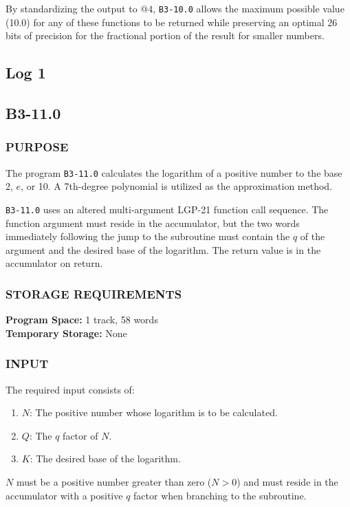 \documentclass{article}
\begin{document}
By standardizing the output to $@4$, \texttt{B3-10.0} allows the maximum possible value (10.0) for any of these functions to be returned while preserving an optimal 26 bits of precision for the fractional portion of the result for smaller numbers.

\newpage
\subsection{Log 1}
\label{sec:logarithm_function}

\subsection*{B3-11.0}

\subsubsection*{PURPOSE}
The program \texttt{B3-11.0} calculates the logarithm of a positive number to the base 2, $e$, or 10. A 7th-degree polynomial is utilized as the approximation method. 

\noindent
\texttt{B3-11.0} uses an altered multi-argument LGP-21 function call sequence. The function argument must reside in the accumulator, but the two words immediately following the jump to the subroutine must contain the $q$ of the argument and the desired base of the logarithm. The return value
is in the accumulator on return.

\subsubsection*{STORAGE REQUIREMENTS}
\noindent
\textbf{Program Space:} 1 track, 58 words \\
\textbf{Temporary Storage:} None

\subsubsection*{INPUT}
\noindent
The required input consists of:
\begin{enumerate}
    \item $N$: The positive number whose logarithm is to be calculated.
    \item $Q$: The $q$ factor of $N$.
    \item $K$: The desired base of the logarithm.
\end{enumerate}

\noindent
$N$ must be a positive number greater than zero ($N > 0$) and must reside in the accumulator with a positive $q$ factor when branching to the subroutine. 
\end{document}
